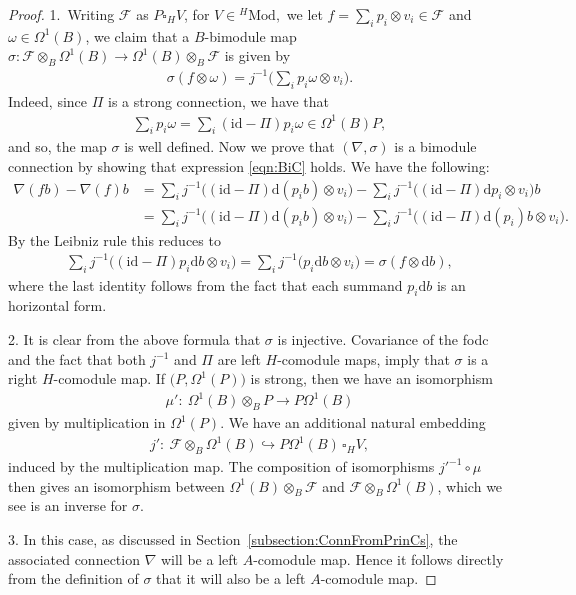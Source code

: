 \documentclass[pdftex]{sigma}
\numberwithin{equation}{section}
\begin{document}
\begin{proof}
1.~Writing $\mathcal{F}$ as $P\square_H V$, for $V\in {}^H\mathrm{Mod},$ we let $f= \sum_i p_i\otimes v_i \in \mathcal{F}$ and $\omega \in \Omega^1(B)$, we claim that a $B$-bimodule map $\sigma\colon \mathcal{F} \otimes_B \Omega^1(B) \to \Omega^1(B) \otimes_B \mathcal{F}$ is given by
\begin{gather*}
 \sigma\left(f \otimes \omega\right)= j^{-1}\bigg(\sum_i p_{i}\omega \otimes v_{i}\bigg) .
\end{gather*}
Indeed, since $\Pi$ is a strong connection, we have that
\begin{gather*}
 \sum_i p_{i}\omega= \sum_i (\mathrm{id} - \Pi)p_{i}\omega\in \Omega^1(B) P,
\end{gather*}
and so, the map $\sigma$ is well defined.
Now we prove that $(\nabla, \sigma)$ is a bimodule connection by showing that expression \eqref{eqn:BiC} holds. We have the following:
\begin{align*}
\nabla(fb)-\nabla(f)b & = \sum_i j^{-1} \big((\mathrm{id} - \Pi)\mathrm{d}( p_{i}b) \otimes v_i \big)-\sum_i j^{-1} \big((\mathrm{id} - \Pi)\mathrm{d} p_{i} \otimes v_i\big)b
\\
&=\sum_i j^{-1} \big((\mathrm{id} - \Pi)\mathrm{d}( p_{i}b) \otimes v_i \big)-\sum_i j^{-1} \big((\mathrm{id} - \Pi)\mathrm{d}(p_{i})b \otimes v_i\big).
\end{align*}
By the Leibniz rule this reduces to
\begin{gather*}
 \sum_i j^{-1} \big((\mathrm{id} - \Pi) p_{i}\mathrm{d} b\otimes v_{i}\big) =\sum_i j^{-1} \big(p_{i}\mathrm{d} b\otimes v_{i}\big)= \sigma (f\otimes \mathrm{d} b),
\end{gather*}
where the last identity follows from the fact that each summand $p_{i}\mathrm{d} b$ is an horizontal form.

2. It is clear from the above formula that $\sigma$ is injective. Covariance of the fodc and the fact that both $j^{-1}$ and $\Pi$ are left $H$-comodule maps, imply that $\sigma$ is a right $H$-comodule map. If $\big(P, \Omega^1(P)\big)$ is strong, then we have an isomorphism
\begin{align*}
\mu'\colon \ \Omega^1(B) \otimes_B P \to P\Omega^1(B)
\end{align*}
given by multiplication in $\Omega^1(P)$. We have an additional natural embedding
\begin{gather*}
j'\colon \ \mathcal{F} \otimes_B \Omega^1(B)\hookrightarrow P\Omega^1(B) \, \square_H V,
\end{gather*}
induced by the multiplication map. The composition of isomorphisms $j'^{-1}\circ\mu$ then gives an isomorphism between $\Omega^1(B) \otimes_B \mathcal{F} $ and $ \mathcal{F} \otimes_B \Omega^1(B)$, which we see is an inverse for $\sigma$.

3. In this case, as discussed in Section~\ref{subsection:ConnFromPrinCs}, the associated connection $\nabla$ will be a left $A$-comodule map. Hence it follows directly from the definition of $\sigma$ that it will also be a left $A$-comodule map.
\end{proof}
\end{document}

